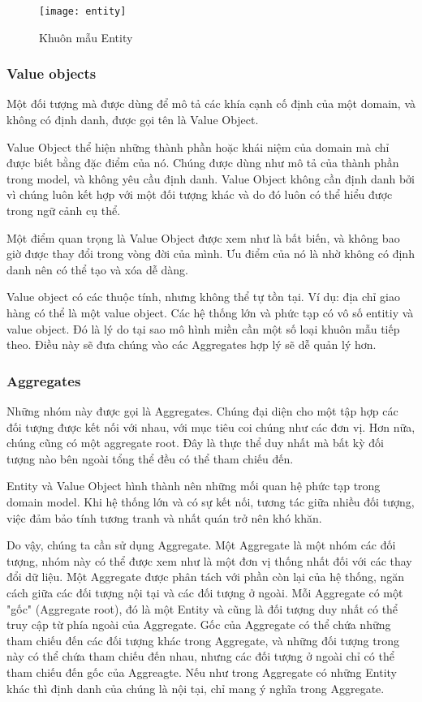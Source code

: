 \begin{figure}[H]
	\centering
	\texttt{[image: entity]}
	\caption{Khuôn mẫu Entity}
\end{figure}

\subsubsection{Value objects}

Một đối tượng mà được dùng để mô tả các khía cạnh cố định của một domain, và không có định danh, được gọi tên là Value Object.

Value Object thể hiện những thành phần hoặc khái niệm của domain mà chỉ được biết bằng đặc điểm của nó. Chúng được dùng như mô tả của thành phần trong model, và không yêu cầu định danh. Value Object không cần định danh bởi vì chúng luôn kết hợp với một đối tượng khác và do đó luôn có thể hiểu được trong ngữ cảnh cụ thể.

Một điểm quan trọng là Value Object được xem như là bất biến, và không bao giờ được thay đổi trong vòng đời của mình. Ưu điểm của nó là nhờ không có định danh nên có thể tạo và xóa dễ dàng.

Value object có các thuộc tính, nhưng không thể tự tồn tại. Ví dụ: địa chỉ giao hàng có thể là một value object. Các hệ thống lớn và phức tạp có vô số entitiy và value object. Đó là lý do tại sao mô hình miền cần một số loại khuôn mẫu tiếp theo. Điều này sẽ đưa chúng vào các Aggregates hợp lý sẽ dễ quản lý hơn.

\subsubsection{Aggregates}

Những nhóm này được gọi là Aggregates. Chúng đại diện cho một tập hợp các đối tượng được kết nối với nhau, với mục tiêu coi chúng như các đơn vị. Hơn nữa, chúng cũng có một aggregate root. Đây là thực thể duy nhất mà bất kỳ đối tượng nào bên ngoài tổng thể đều có thể tham chiếu đến.

Entity và Value Object hình thành nên những mối quan hệ phức tạp trong domain model. Khi hệ thống lớn và có sự kết nối, tương tác giữa nhiều đối tượng, việc đảm bảo tính tương tranh và nhất quán trở nên khó khăn.

Do vậy, chúng ta cần sử dụng Aggregate. Một Aggregate là một nhóm các đối tượng, nhóm này có thể được xem như là một đơn vị thống nhất đối với các thay đổi dữ liệu. Một Aggregate được phân tách với phần còn lại của hệ thống, ngăn cách giữa các đối tượng nội tại và các đối tượng ở ngoài. Mỗi Aggregate có một "gốc" (Aggregate root), đó là một Entity và cũng là đối tượng duy nhất có thể truy cập từ phía ngoài của Aggregate. Gốc của Aggregate có thể chứa những tham chiếu đến các đối tượng khác trong Aggregate, và những đối tượng trong này có thể chứa tham chiếu đến nhau, nhưng các đối tượng ở ngoài chỉ có thể tham chiếu đến gốc của Aggreagte. Nếu như trong Aggregate có những Entity khác thì định danh của chúng là nội tại, chỉ mang ý nghĩa trong Aggregate.

